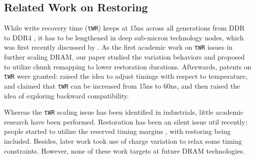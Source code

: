 \subsection{Related Work on Restoring}
While write recovery time ({\tt tWR}) keeps at 15ns across all generations from DDR to DDR4 \cite{JEDEC:ddr, JEDEC:ddr2, JEDEC:ddr3, JEDEC:ddr4}, it has to be lengthened in deep sub-micron technology nodes, which was first recently discussed by .
As the first academic work on {\tt tWR} issues in further scaling DRAM, our paper \cite{DATE15:twr} studied the variation behaviors and proposed to utilize chunk remapping to lower restoration durations.
Afterwards, patents on {\tt tWR} were granted:  raised the idea to adjust timings with respect to temperature, and  claimed that {\tt tWR} can be increased from 15ns to 60ns, and then raised the idea of exploring backward compatibility.

Whereas the {\tt tWR} scaling issue has been identified in industrials, little academic research have been performed. Restoration has been an silent issue util recently; people started to utilize the reserved timing margins \cite{DATE14:margin, HPCA15:al-dram}, with restoring being included. Besides, later work \cite{ISCA15:mcr} took use of charge variation to relax some timing constraints. However, none of these work targets at future DRAM technologies.

